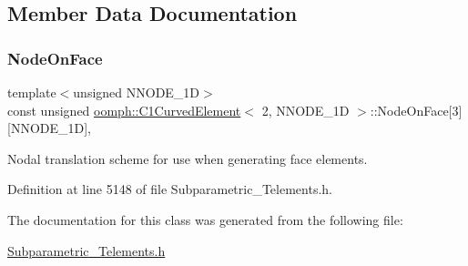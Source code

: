 \subsection{Member Data Documentation}
\mbox{\label{classoomph_1_1C1CurvedElement_3_012_00_01NNODE__1D_01_4_a7af342e536c2474e8377eab50c29415a}} 
\subsubsection{\texorpdfstring{Node\+On\+Face}{NodeOnFace}}
{\footnotesize\ttfamily template$<$unsigned N\+N\+O\+D\+E\+\_\+1D$>$ \\
const unsigned \hyperlink{classoomph_1_1C1CurvedElement}{oomph\+::\+C1\+Curved\+Element}$<$ 2, N\+N\+O\+D\+E\+\_\+1D $>$\+::Node\+On\+Face\mbox{[}3\mbox{]}\mbox{[}N\+N\+O\+D\+E\+\_\+1D\mbox{]}\hspace{0.3cm}{\ttfamily [static]}, {\ttfamily [private]}}



Nodal translation scheme for use when generating face elements. 



Definition at line 5148 of file Subparametric\+\_\+\+Telements.\+h.



The documentation for this class was generated from the following file\+:\begin{DoxyCompactItemize}
\item 
\hyperlink{Subparametric__Telements_8h}{Subparametric\+\_\+\+Telements.\+h}\end{DoxyCompactItemize}
